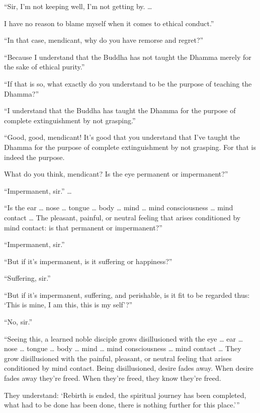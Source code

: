 \documentclass[12pt,openany]{book}%
\begin{document}
“Sir, I’m not keeping well, I’m not getting by. … 

I have no reason to blame myself when it comes to ethical conduct.” 

“In that case, mendicant, why do you have remorse and regret?” 

“Because I understand that the Buddha has not taught the Dhamma merely for the sake of ethical purity.” 

“If that is so, what exactly do you understand to be the purpose of teaching the Dhamma?” 

“I understand that the Buddha has taught the Dhamma for the purpose of complete extinguishment by not grasping.” 

“Good, good, mendicant! It’s good that you understand that I’ve taught the Dhamma for the purpose of complete extinguishment by not grasping. For that is indeed the purpose. 

What do you think, mendicant? Is the eye permanent or impermanent?” 

“Impermanent, sir.” … 

“Is the ear … nose … tongue … body … mind … mind consciousness … mind contact … The pleasant, painful, or neutral feeling that arises conditioned by mind contact: is that permanent or impermanent?” 

“Impermanent, sir.” 

“But if it’s impermanent, is it suffering or happiness?” 

“Suffering, sir.” 

“But if it’s impermanent, suffering, and perishable, is it fit to be regarded thus: ‘This is mine, I am this, this is my self’?” 

“No, sir.” 

“Seeing this, a learned noble disciple grows disillusioned with the eye … ear … nose … tongue … body … mind … mind consciousness … mind contact … They grow disillusioned with the painful, pleasant, or neutral feeling that arises conditioned by mind contact. Being disillusioned, desire fades away. When desire fades away they’re freed. When they’re freed, they know they’re freed. 

They understand: ‘Rebirth is ended, the spiritual journey has been completed, what had to be done has been done, there is nothing further for this place.’” 
\end{document}
